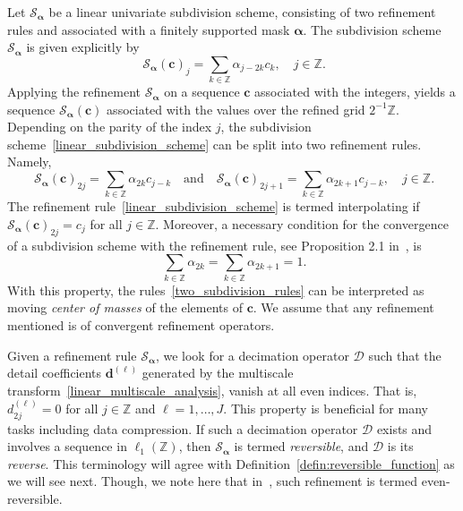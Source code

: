 \documentclass[12pt]{article}
\begin{document}
Let $\mathcal{S}_{\boldsymbol{\alpha}}$ be a linear univariate subdivision scheme, consisting of two refinement rules and associated with a finitely supported mask $\boldsymbol{\alpha}$. The subdivision scheme $\mathcal{S}_{\boldsymbol{\alpha}}$ is given explicitly by
\begin{equation}~\label{linear_subdivision_scheme}
    \mathcal{S}_{\boldsymbol{\alpha}}(\boldsymbol{c})_j = \sum_{k\in\mathbb{Z}}\alpha_{j-2k}c_k, \quad j\in\mathbb{Z}.
\end{equation}
Applying the refinement $\mathcal{S}_{\boldsymbol{\alpha}}$ on a sequence $\boldsymbol{c}$ associated with the integers, yields a sequence $\mathcal{S}_{\boldsymbol{\alpha}}(\boldsymbol{c})$ associated with the values over the refined grid $2^{-1}\mathbb{Z}$. Depending on the parity of the index $j$, the subdivision scheme~\eqref{linear_subdivision_scheme} can be split into two refinement rules. Namely,
\begin{equation}~\label{two_subdivision_rules}
\mathcal{S}_{\boldsymbol{\alpha}}(\boldsymbol{c})_{2j} = \sum_{k\in\mathbb{Z}}\alpha_{2k}c_{j-k} \quad \text{and} \quad \mathcal{S}_{\boldsymbol{\alpha}}(\boldsymbol{c})_{2j+1} = \sum_{k\in\mathbb{Z}}\alpha_{2k+1}c_{j-k}, \quad j\in\mathbb{Z}.
\end{equation}
The refinement rule~\eqref{linear_subdivision_scheme} is termed interpolating if $\mathcal{S}_{\boldsymbol{\alpha}}(\boldsymbol{c})_{2j} = c_j$ for all $j\in\mathbb{Z}$. Moreover, a necessary condition for the convergence of a subdivision scheme with the refinement rule, see Proposition 2.1 in~\cite{dyn1992subdivision}, is
\begin{equation}~\label{eqn:partition_of_unity}
\sum_{k\in\mathbb{Z}}\alpha_{2k} = \sum_{k\in\mathbb{Z}}\alpha_{2k+1} = 1.
\end{equation}
With this property, the rules~\eqref{two_subdivision_rules} can be interpreted as moving \emph{center of masses} of the elements of $\boldsymbol{c}$. We assume that any refinement mentioned is of convergent refinement operators.

Given a refinement rule $\mathcal{S}_{\boldsymbol{\alpha}}$, we look for a decimation operator $\mathcal{D}$ such that the detail coefficients $\boldsymbol{d}^{(\ell)}$ generated by the multiscale transform~\eqref{linear_multiscale_analysis}, vanish at all even indices. That is, $d^{(\ell)}_{2j}=0$ for all $j\in\mathbb{Z}$ and $\ell=1,\dots,J$. This property is beneficial for many tasks including data compression. If such a decimation operator $\mathcal{D}$ exists and involves a sequence in $\ell_1(\mathbb{Z})$, then $\mathcal{S}_{\boldsymbol{\alpha}}$ is termed \emph{reversible}, and $\mathcal{D}$ is its \emph{reverse}. This terminology will agree with Definition~\ref{defin:reversible_function} as we will see next. Though, we note here that in~\cite{mattar2023pyramid, dyn2021linear}, such refinement is termed even-reversible.
\end{document}
